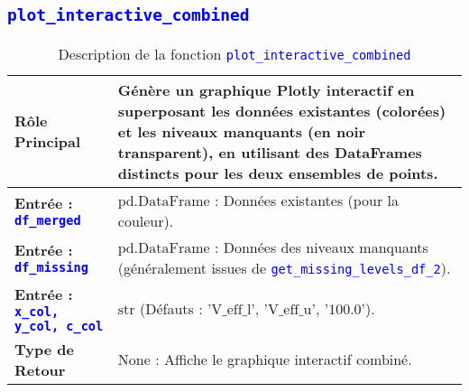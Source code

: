\documentclass{article}
\newcommand{\code}[1]{\texttt{\textcolor{blue}{#1}}}
\begin{document}
\subsection{\code{plot\_interactive\_combined}}

\begin{longtable}{|>{\raggedright\arraybackslash}p{}|>{\raggedright\arraybackslash}p{}|}
    \caption{Description de la fonction \code{plot\_interactive\_combined}} \\
    \toprule
    \textbf{Rôle Principal} & Génère un graphique Plotly interactif en superposant les données existantes (colorées) et les niveaux manquants (en noir transparent), en utilisant des DataFrames distincts pour les deux ensembles de points. \\
    \midrule
    \textbf{Entrée : \code{df\_merged}} & $\text{pd.DataFrame}$ : Données existantes (pour la couleur). \\
    \midrule
    \textbf{Entrée : \code{df\_missing}} & $\text{pd.DataFrame}$ : Données des niveaux manquants (généralement issues de \code{get\_missing\_levels\_df\_2}). \\
    \midrule
    \textbf{Entrée : \code{x\_col, y\_col, c\_col}} & $\text{str}$ (Défauts : $\text{'V\_eff\_l', 'V\_eff\_u', '100.0'}$). \\
    \midrule
    \textbf{Type de Retour} & $\text{None}$ : Affiche le graphique interactif combiné. \\
    \bottomrule
\end{longtable}
\end{document}
